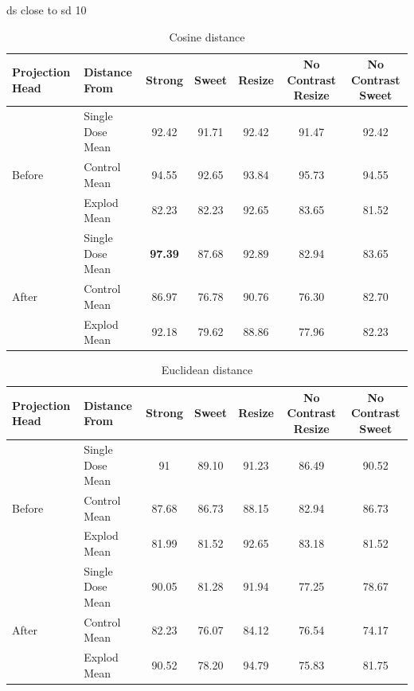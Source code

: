 ds close to sd 10

\begin{table}[H]
  \centering
  \begin{tabular}{@{}llccccc@{}}
  \toprule
  Projection Head & Distance From      & Strong & Sweet & Resize & No Contrast Resize & No Contrast Sweet \\ \midrule
                  & Single Dose Mean   & 92.42      & 91.71     & 92.42      & 91.47                  & 92.42                 \\
  Before          & Control Mean       & 94.55      & 92.65     & 93.84      & 95.73                   & 94.55                 \\
                  & Explod Mean        & 82.23      & 82.23     & 92.65     & 83.65                  & 81.52                \\ \midrule
                  & Single Dose Mean   & \textbf{97.39}  & 87.68     & 92.89     & 82.94                  & 83.65                 \\
  After           & Control Mean       & 86.97      & 76.78    & 90.76      & 76.30                 & 82.70                 \\
                  & Explod Mean        & 92.18      & 79.62    & 88.86      & 77.96                  & 82.23                 \\ \bottomrule
  \end{tabular}
  \caption{Cosine distance}
  \label{tab:your_table_label}
\end{table}


\begin{table}[H]
  \centering
  \begin{tabular}{@{}llccccc@{}}
  \toprule
  Projection Head & Distance From      & Strong & Sweet & Resize & No Contrast Resize & No Contrast Sweet \\ \midrule
                  & Single Dose Mean   & 91      & 89.10     & 91.23      & 86.49                  & 90.52                 \\
  Before          & Control Mean       & 87.68      & 86.73     & 88.15      & 82.94                  & 86.73                 \\
                  & Explod Mean        & 81.99      & 81.52     & 92.65      & 83.18                  &   81.52               \\ \midrule
                  & Single Dose Mean   & 90.05      & 81.28     & 91.94      & 77.25                  & 78.67                 \\
  After           & Control Mean       & 82.23      & 76.07     & 84.12      & 76.54                  & 74.17                 \\
                  & Explod Mean        & 90.52      & 78.20    & 94.79      & 75.83                  & 81.75                 \\ \bottomrule
  \end{tabular}
  \caption{Euclidean distance}
  \label{tab:your_table}
\end{table}



